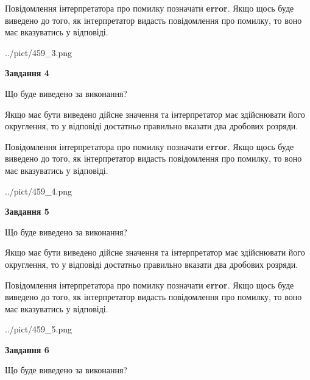 \documentclass[12pt, ukrainian]{article}
\begin{document}
{\begin {Large}
Повідомлення інтерпретатора про помилку позначати \textbf{error}.
Якщо щось буде виведено до того, як інтерпретатор видасть повідомлення про помилку, 
то воно має вказуватись у відповіді. \par

\begin{center}
	{../pict/459_3.png}
\end{center}
\newpage

{\begin {center}\textbf{Завдання 4}\end {center}}\par
Що буде виведено за виконання? \par

Якщо має бути виведено дійсне значення та інтерпретатор має здійснювати його округлення, 
то у відповіді достатньо правильно вказати два дробових розряди.

Повідомлення інтерпретатора про помилку позначати \textbf{error}.
Якщо щось буде виведено до того, як інтерпретатор видасть повідомлення про помилку, 
то воно має вказуватись у відповіді. \par

\begin{center}
	{../pict/459_4.png}
\end{center}
\newpage

{\begin {center}\textbf{Завдання 5}\end {center}}\par
Що буде виведено за виконання? \par

Якщо має бути виведено дійсне значення та інтерпретатор має здійснювати його округлення, 
то у відповіді достатньо правильно вказати два дробових розряди.

Повідомлення інтерпретатора про помилку позначати \textbf{error}.
Якщо щось буде виведено до того, як інтерпретатор видасть повідомлення про помилку, 
то воно має вказуватись у відповіді. \par

\begin{center}
	{../pict/459_5.png}
\end{center}
\newpage

{\begin {center}\textbf{Завдання 6}\end {center}}\par
Що буде виведено за виконання? \par


\end{Large}}
\end{document}
